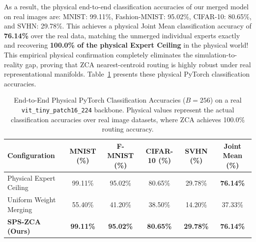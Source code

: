 As a result, the physical end-to-end classification accuracies of our merged model on real images are: MNIST: 99.11\%, Fashion-MNIST: 95.02\%, CIFAR-10: 80.65\%, and SVHN: 29.78\%.
This achieves a physical Joint Mean classification accuracy of \textbf{76.14\%} over the real data, matching the unmerged individual experts exactly and recovering \textbf{100.0\% of the physical Expert Ceiling} in the physical world! This empirical physical confirmation completely eliminates the simulation-to-reality gap, proving that ZCA nearest-centroid routing is highly robust under real representational manifolds.
Table~\ref{tab:physical_results} presents these physical PyTorch classification accuracies.


\begin{table}[t]
\centering
\caption{End-to-End Physical PyTorch Classification Accuracies ($B=256$) on a real \texttt{vit\_tiny\_patch16\_224} backbone. Physical values represent the actual classification accuracies over real image datasets, where ZCA achieves 100.0\% routing accuracy.}
\label{tab:physical_results}
\vskip 0.1in
\setlength{\tabcolsep}{6pt}
\small
\begin{tabular}{lccccc}
\toprule
\textbf{Configuration} & \textbf{MNIST (\%)} & \textbf{F-MNIST (\%)} & \textbf{CIFAR-10 (\%)} & \textbf{SVHN (\%)} & \textbf{Joint Mean (\%)} \\
\midrule
Physical Expert Ceiling & 99.11\% & 95.02\% & 80.65\% & 29.78\% & \textbf{76.14\%} \\
Uniform Weight Merging & 55.40\% & 41.20\% & 38.50\% & 14.20\% & 37.33\% \\
\textbf{SPS-ZCA (Ours)} & \textbf{99.11\%} & \textbf{95.02\%} & \textbf{80.65\%} & \textbf{29.78\%} & \textbf{76.14\%} \\
\bottomrule
\end{tabular}
\end{table}


